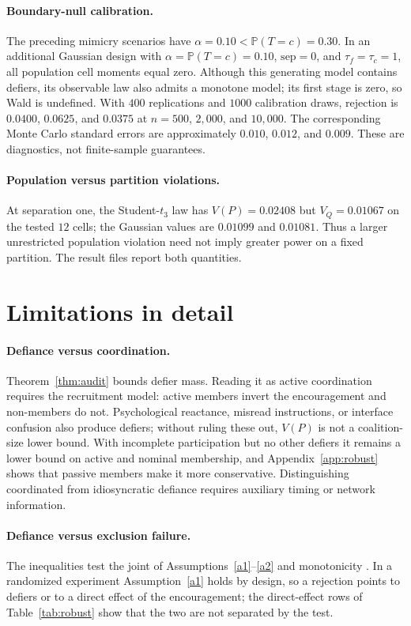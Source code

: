 \documentclass{article}
\theoremstyle{remark}
\newcommand{\Prob}{\mathbb{P}}
\begin{document}
\paragraph{Boundary-null calibration.} The preceding mimicry scenarios have
$\alpha=0.10<\Prob(T=c)=0.30$. In an additional Gaussian design with
$\alpha=\Prob(T=c)=0.10$, $\mathrm{sep}=0$, and $\tau_f=\tau_c=1$, all
population cell moments equal zero. Although this generating model contains
defiers, its observable law also admits a monotone model; its first stage is
zero, so Wald is undefined. With $400$ replications and $1000$ calibration
draws, rejection is $0.0400$, $0.0625$, and $0.0375$ at $n=500$, $2{,}000$,
and $10{,}000$. The corresponding Monte Carlo standard errors are approximately
$0.010$, $0.012$, and $0.009$. These are diagnostics, not finite-sample guarantees.

\paragraph{Population versus partition violations.} At separation one,
the Student-$t_3$ law has $V(P)=0.02408$ but $V_Q=0.01067$ on the tested
$12$ cells; the Gaussian values are $0.01099$ and $0.01081$.
Thus a larger unrestricted population violation need not imply greater power
on a fixed partition. The result files report both quantities.

\section{Limitations in detail}\label{app:limits}

\paragraph{Defiance versus coordination.} Theorem~\ref{thm:audit} bounds defier mass. Reading it as active coordination requires the recruitment model: active members invert the encouragement and non-members do not. Psychological reactance, misread instructions, or interface confusion also produce defiers; without ruling these out, $V(P)$ is not a coalition-size lower bound. With incomplete participation but no other defiers it remains a lower bound on active and nominal membership, and Appendix~\ref{app:robust} shows that passive members make it more conservative. Distinguishing coordinated from idiosyncratic defiance requires auxiliary timing or network information.

\paragraph{Defiance versus exclusion failure.} The inequalities test the joint of Assumptions~\ref{a1}--\ref{a2} and monotonicity \citep{kitagawa2015}. In a randomized experiment Assumption~\ref{a1} holds by design, so a rejection points to defiers or to a direct effect of the encouragement; the direct-effect rows of Table~\ref{tab:robust} show that the two are not separated by the test.
\end{document}
